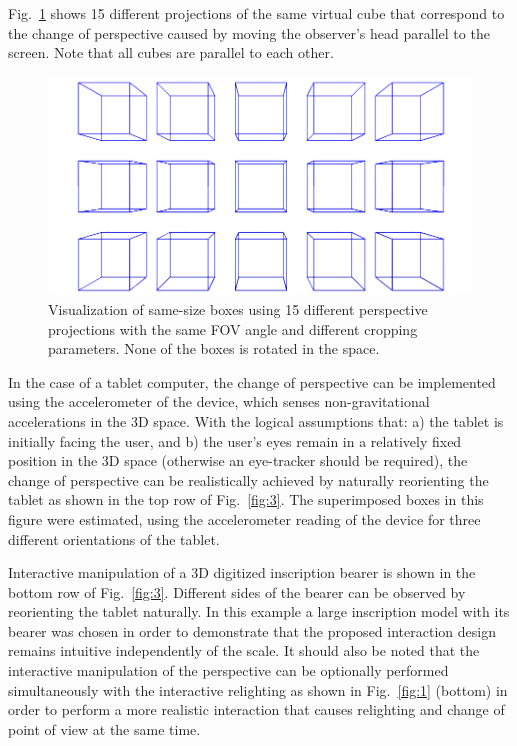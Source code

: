\documentclass[amsthm,ebook]{saparticle}
\begin{document}
Fig.~\ref{fig:2} shows 15 different projections of the same virtual cube that correspond to the change of perspective caused
by moving the observer's head parallel to the screen. Note that all cubes are parallel to each other.




\begin{figure}[!bp]
\centering
 \includegraphics[width=\columnwidth]{EAGLE2016cameraready-img003.png}
\caption{Visualization of same-size boxes using 15 different perspective projections with the same FOV angle and
different cropping parameters. None of the boxes is rotated in the space. }
\label{fig:2}
\end{figure}





In the case of a tablet computer, the change of perspective can be implemented using the accelerometer of the device,
which senses non-gravitational accelerations in the 3D space. With the logical assumptions that: a) the tablet is
initially facing the user, and b) the user's eyes remain in a relatively fixed position in the 3D space (otherwise an
eye-tracker should be required), the change of perspective can be realistically achieved by naturally reorienting the
tablet as shown in the top row of Fig.~\ref{fig:3}. The superimposed boxes in this figure were estimated, using the
accelerometer reading of the device for three different orientations of the tablet. 

Interactive manipulation of a 3D digitized inscription bearer is shown in the bottom row of Fig.~\ref{fig:3}. Different sides of
the bearer can be observed by reorienting the tablet naturally. In this example a large inscription model with its
bearer was chosen in order to demonstrate that the proposed interaction design remains intuitive independently of the
scale. It should also be noted that the interactive manipulation of the perspective can be optionally performed
simultaneously with the interactive relighting as shown in Fig.~\ref{fig:1} (bottom) in order to perform a more realistic
interaction that causes relighting and change of point of view at the same time. 
\end{document}

